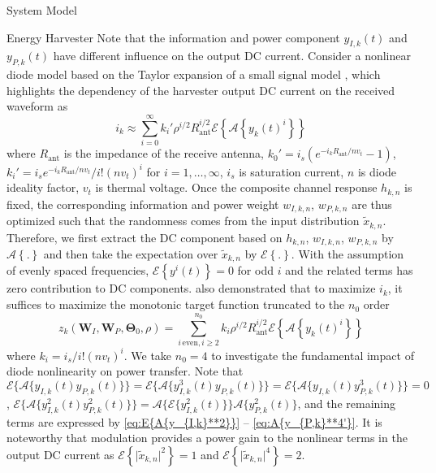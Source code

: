 \documentclass{IEEEtran}
\begin{document}
\begin{section}{System Model}
	\begin{subsection}{Energy Harvester}
		Note that the information and power component $y_{I,k}(t)$ and $y_{P,k}(t)$ have different influence on the output DC current. Consider a nonlinear diode model based on the Taylor expansion of a small signal model \cite{Clerckx2018b,Clerckx2016a}, which highlights the dependency of the harvester output DC current on the received waveform as
		\begin{equation}\label{eq:i_k}
			i_k\approx\sum_{i=0}^{\infty}{k_i'}{\rho^{i/2}}{R_{\text{ant}}^{i/2}}\mathcal{E}\left\{{\mathcal{A}\left\{y_k(t)^i\right\}}\right\}
		\end{equation}
		where $R_{\text{ant}}$ is the impedance of the receive antenna, $k_0'=i_s(e^{-i_kR_{\text{ant}}/nv_t}-1)$, $k_i'=i_se^{-i_kR_{\text{ant}}/nv_t}/i!(nv_t)^i$ for $i=1,\dots,\infty$, $i_s$ is saturation current, $n$ is diode ideality factor, $v_t$ is thermal voltage. Once the composite channel response $h_{k,n}$ is fixed, the corresponding information and power weight $w_{I,k,n}$, $w_{P,k,n}$ are thus optimized such that the randomness comes from the input distribution $\tilde{x}_{k,n}$. Therefore, we first extract the DC component based on $h_{k,n}$, $w_{I,k,n}$, $w_{P,k,n}$ by $\mathcal{A}\left\{.\right\}$ and then take the expectation over $\tilde{x}_{k,n}$ by $\mathcal{E}\left\{.\right\}$. With the assumption of evenly spaced frequencies, $\mathcal{E}\left\{y^i(t)\right\}=0$ for odd $i$ and the related terms has zero contribution to DC components. \cite{Clerckx2016a} also demonstrated that to maximize $i_k$, it suffices to maximize the monotonic target function truncated to the $n_0$ order
		\begin{equation}\label{eq:z_k}
			z_k(\boldsymbol{W}_I,\boldsymbol{W}_P,\boldsymbol{\Theta}_0,\rho)=\sum_{i\,\text{even},i\ge2}^{n_0}{k_i}{\rho^{i/2}}{R_{\text{ant}}^{i/2}}{\mathcal{E}\left\{\mathcal{A}\left\{y_k(t)^i\right\}\right\}}
		\end{equation}
		where $k_i=i_s/i!(nv_t)^i$. We take $n_0=4$ to investigate the fundamental impact of diode nonlinearity on power transfer. Note that $\mathcal{E}\{\mathcal{A}\{y_{I,k}(t)y_{P,k}(t)\}\}=\mathcal{E}\{\mathcal{A}\{y_{I,k}^3(t)y_{P,k}(t)\}\}=\mathcal{E}\{\mathcal{A}\{y_{I,k}(t)y_{P,k}^3(t)\}\}=0$, $\mathcal{E}\{\mathcal{A}\{y_{I,k}^2(t)y_{P,k}^2(t)\}\}=\mathcal{A}\{\mathcal{E}\{y_{I,k}^2(t)\}\}\mathcal{A}\{y_{P,k}^2(t)\}$, and the remaining terms are expressed by \ref{eq:E{A{y_{I,k}**2}}} -- \ref{eq:A{y_{P,k}**4'}}. It is noteworthy that modulation provides a power gain to the nonlinear terms in the output DC current as $\mathcal{E}\left\{\lvert\tilde{x}_{k,n}\rvert^2\right\}=1$ and $\mathcal{E}\left\{\lvert\tilde{x}_{k,n}\rvert^4\right\}=2$.

\end{subsection}
\end{section}
\end{document}
